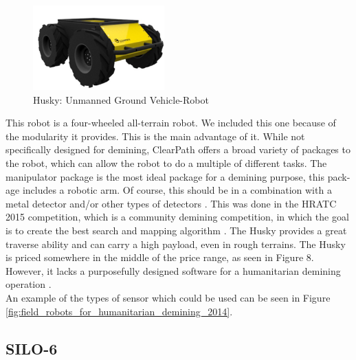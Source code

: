 \begin{figure}
    \centering
      \includegraphics[width=0.45\textwidth]{00 - Images/husky_unmanned_ground_vehicle_robot.png}
  \caption{Husky: Unmanned Ground Vehicle-Robot \cite{ClearPath2020}}
  \label{fig:husky_unmanned_ground_vehicle_robot}
\end{figure}
This robot is a four-wheeled all-terrain robot. We included this one because of the modularity it provides. This is the main advantage of it. While not specifically designed for demining, ClearPath offers a broad variety of packages to the robot, which can allow the robot to do a multiple of different tasks. The manipulator package is the most ideal package for a demining purpose, this pack-age includes a robotic arm. Of course, this should be in a combination with a metal detector and/or other types of detectors \cite{ClearPath2020}. This was done in the HRATC 2015 competition, which is a community demining competition, in which the goal is to create the best search and mapping algorithm \cite{HRATC2015}. The Husky provides a great traverse ability and can carry a high payload, even in rough terrains. The Husky is priced somewhere in the middle of the price range, as seen in Figure 8. However, it lacks a purposefully designed software for a humanitarian demining operation \cite{ClearPath2020}.\\

An example of the types of sensor which could be used can be seen in Figure \ref{fig:field_robots_for_humanitarian_demining_2014}.

\subsection{SILO-6}

